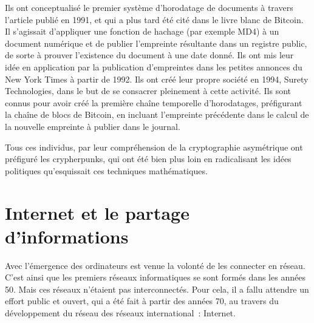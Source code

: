 Ils ont conceptualisé le premier système d'horodatage de documents à travers l'article  publié en 1991, et qui a plus tard été cité dans le livre blanc de Bitcoin. Il s'agissait d'appliquer une fonction de hachage (par exemple MD4) à un document numérique et de publier l'empreinte résultante dans un registre public, de sorte à prouver l'existence du document à une date donné. Ils ont mis leur idée en application par la publication d'empreintes dans les petites annonces du New York Times à partir de 1992. Ils ont créé leur propre société en 1994, Surety Technologies, dans le but de se consacrer pleinement à cette activité. Ils sont connus pour avoir créé la première chaîne temporelle d'horodatages, préfigurant la chaîne de blocs de Bitcoin, en incluant l'empreinte précédente dans le calcul de la nouvelle empreinte à publier dans le journal.

Tous ces individus, par leur compréhension de la cryptographie asymétrique ont préfiguré les crypherpunks, qui ont été bien plus loin en radicalisant les idées politiques qu'esquissait ces techniques mathématiques.

\section*{Internet et le partage d'informations}


Avec l'émergence des ordinateurs est venue la volonté de les connecter en réseau. C'est ainsi que les premiers réseaux informatiques se sont formés dans les années 50. Mais ces réseaux n'étaient pas interconnectés. Pour cela, il a fallu attendre un effort public et ouvert, qui a été fait à partir des années 70, au travers du développement du réseau des réseaux international~: Internet.

